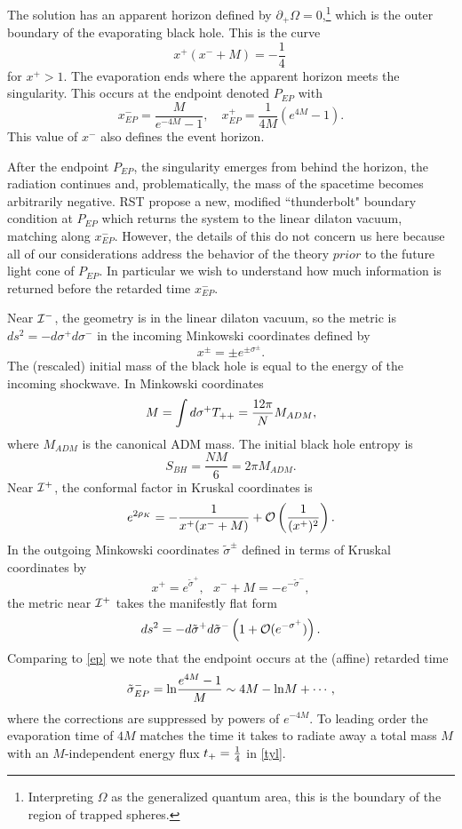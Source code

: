 \documentclass[11pt,oneside,letterpaper]{article}
\newcommand{\p}{\partial}
\newcommand{\be}{\begin{equation}}
\newcommand{\ee}{\end{equation}}
\def\be{\begin{eqnarray}}
\def\ee{\end{eqnarray}}
\let\s=\sigma \let\t=\tau \let\u=\upsilon \let\c=\chi
\def\be{\begin{equation}}
\def\ee{\end{equation}}
\def\m{{M}}
\def\log{{\rm ln}}
\renewcommand{\p}{\partial}
\numberwithin{equation}{section}
\def \be {\begin{equation}}
\def \ee {\end{equation}}
\begin{document}
The solution has an apparent horizon defined by $\p_+ \Omega = 0$,\footnote{Interpreting $\Omega$ as the generalized quantum area, this is the boundary of the region of trapped spheres.} which is the outer boundary of the evaporating black hole. This is the curve
\be
x^+ (  x^-  +{\m}{} )= -\frac{1}{4 } \ 
\ee
for $x^+>1$.
The evaporation ends where the apparent horizon meets the singularity. This occurs at the endpoint denoted $P_{EP}$ with
\be\label{ep}
x_{EP}^- = \frac{\m }{e^{-4\m } - 1} , \quad
x_{EP}^+ = \frac{1}{4\m}(e^{4 \m }-1) .
\ee
This value of $x^-$ also defines the event horizon. 

After the endpoint $P_{EP}$, the singularity emerges from behind the horizon, the radiation continues 
and, problematically, the mass of the spacetime becomes arbitrarily negative. RST propose a new, modified  
``thunderbolt" boundary condition at $P_{EP}$ which returns the system to the linear dilaton vacuum, matching along $x^-_{EP}$.
However, the details of this do  not concern us here because all of our considerations address the behavior of the theory $prior$ to the future light cone of $P_{EP}$. In particular we wish to understand how much information is returned before the retarded time  $x^-_{EP}$. 

 
Near ${\cal I}^-$, the geometry is in the linear dilaton vacuum, so the metric is $ds^2=-d\sigma^+ d\sigma^-$ in the incoming Minkowski coordinates defined by 
\be\label{imc}
 x^{\pm} = \pm e^{\pm  \sigma^\pm}  .
\ee
The (rescaled) initial mass of the black hole is equal to the energy of the incoming shockwave. In Minkowski coordinates
\be
\m = \int d\sigma^+ T_{++} ={12 \pi \over N}M_{ADM},
\ee
where $M_{ADM}$ is the canonical ADM mass. 
The initial black hole entropy is
\be\label{sinit}
S_{BH} = \frac{N \m }{6} =2\pi M_{ADM}.
\ee
Near ${\cal I}^+$, the conformal factor in Kruskal coordinates is 
\be\label{confplus}
e^{2\rho_K} = - \frac{1}{x^+ (x^- + \m)} + {\cal O}\left( \frac{1}{(x^+)^2}\right) .
\ee
In the outgoing Minkowski coordinates $\tilde \s^\pm$ defined in terms of Kruskal coordinates by 
\be \label{omc} x^+=e^{\tilde\s^+},~~~x^-+\m=-e^{-\tilde \s^-},\ee
the metric near ${\cal I}^+$ takes the manifestly  flat form 
\be ds^2=-d\tilde{\sigma}^+ d \tilde{\sigma}^-\left(1+{\cal O}(e^{-\s^+})\right).\ee
Comparing to \eqref{ep} we note that the endpoint occurs at the (affine) retarded time 
\be \label{rep} \tilde \s^-_{EP}=\log {e^{4\m}-1\over \m} \sim 4\m-\log \m+\cdots ,\ee
where the corrections are suppressed by powers of $e^{-4\m}$.
To leading order the evaporation time of $4\m$ matches the time it takes to radiate away a total mass $\m$ with an $\m$-independent energy flux 
$t_+={1 \over 4}$ in \eqref{tyl}. 
\end{document}
